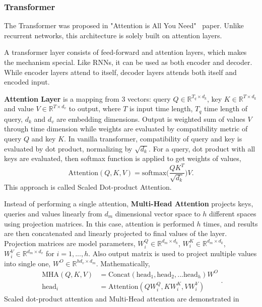 \subsubsection{Transformer}

The Transformer was proposed in "Attention is All You Need"~ \cite{vaswani_attention_2017} paper. 
Unlike recurrent networks, this architecture is solely built on attention layers. 

A transformer layer consists of feed-forward and attention layers, which makes the mechanism special. 
Like RNNs, it can be used as both encoder and decoder. 
While encoder layers attend to itself, decoder layers attends both itself and encoded input. 

\textbf{Attention Layer} is a mapping from 3 vectors: query $Q \in \mathbb{R}^{T_q \times d_k}$, key $K \in \mathbb{R}^{T \times d_k}$ and value $V \in \mathbb{R}^{T \times d_v}$ to output, 
where $T$ is input time length, $T_q$ time length of query, $d_k$ and $d_v$ are embedding dimensions. 
Output is weighted sum of values $V$ through time dimension while weights are evaluated by compatibility metric of query $Q$ and key $K$. 
In vanilla transformer, compatibility of query and key is evaluated by dot product, normalizing by $\sqrt{d_k}$. 
For a query, dot product with all keys are evaluated, then softmax function is applied to get weights of values, 
\begin{equation}
\mathrm{Attention}(Q, K, V) = \mathrm{softmax}\bigg(\frac{Q K^{T}}{\sqrt{d_k}}\bigg) V.
\end{equation}
This approach is called Scaled Dot-product Attention. 

Instead of performing a single attention, \textbf{Multi-Head Attention} projects keys, queries and values linearly from $d_m$ dimensional vector space to $h$ different spaces using projection matrices. 
In this case, attention is performed $h$ times, and results are then concatenated and linearly projected to final values of the layer.
Projection matrices are model parameters, $W^Q_i \in \mathbb{R}^{d_m \times d_k}$, $W^K_i \in \mathbb{R}^{d_m \times d_k}$, $W^V_i \in \mathbb{R}^{d_m \times d_v}$ for $i=1,...,h$. 
Also output matrix is used to project multiple values into single one, $W^O \in \mathbb{R}^{h d_v \times d_m}$. Mathematically, 
\begin{equation}
\begin{split}
\mathrm{MHA}(Q,K,V) &=  \text{Concat}(\mathrm{head}_1, \mathrm{head}_2, ... \mathrm{head}_h)W^O \\
\mathrm{head}_i &=  \text{Attention}(QW^Q_i,KW^K_i,VW^V_i)
\end{split}.
\end{equation}
Scaled dot-product attention and Multi-Head attention are demonstrated in 

